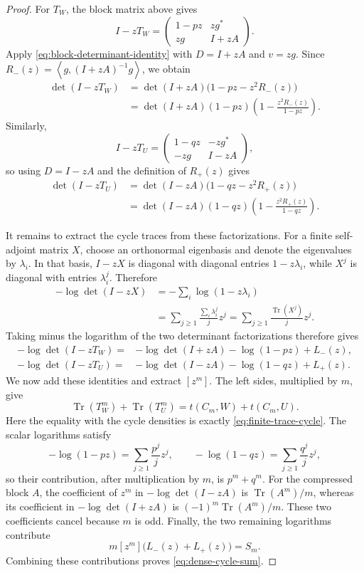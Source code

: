 \documentclass[11pt]{article}
\newcommand{\ip}[2]{\left\langle #1,#2\right\rangle}
\newcommand{\Tr}{\operatorname{Tr}}
\begin{document}
\begin{proof}
For \(T_W\), the block matrix above gives
\[
 I-zT_W=
 \begin{pmatrix}
  1-pz&zg^*\\
  zg&I+zA
 \end{pmatrix}.
\]
Apply \eqref{eq:block-determinant-identity} with
\(D=I+zA\) and \(v=zg\).  Since
\(R_-(z)=\ip g{(I+zA)^{-1}g}\), we obtain
\begin{align*}
 \det(I-zT_W)
 &=\det(I+zA)\bigl(1-pz-z^2R_-(z)\bigr)\\
 &=\det(I+zA)(1-pz)
   \left(1-\frac{z^2R_-(z)}{1-pz}\right).
\end{align*}
Similarly,
\[
 I-zT_U=
 \begin{pmatrix}
  1-qz&-zg^*\\
  -zg&I-zA
 \end{pmatrix},
\]
so using \(D=I-zA\) and the definition of \(R_+(z)\) gives
\begin{align*}
 \det(I-zT_U)
 &=\det(I-zA)\bigl(1-qz-z^2R_+(z)\bigr)\\
 &=\det(I-zA)(1-qz)
   \left(1-\frac{z^2R_+(z)}{1-qz}\right).
\end{align*}

It remains to extract the cycle traces from these factorizations.  For a
finite self-adjoint matrix \(X\), choose an orthonormal eigenbasis and denote
the eigenvalues by \(\lambda_i\).  In that basis, \(I-zX\) is diagonal with
diagonal entries \(1-z\lambda_i\), while \(X^j\) is diagonal with entries
\(\lambda_i^j\).  Therefore
\[
\begin{aligned}
 -\log\det(I-zX)
 &=-\sum_i\log(1-z\lambda_i)\\
 &=\sum_{j\ge1}\frac{\sum_i\lambda_i^j}{j}z^j
 =\sum_{j\ge1}\frac{\Tr(X^j)}{j}z^j.
\end{aligned}
\]
Taking minus the logarithm of the two determinant factorizations therefore
gives
\begin{align*}
 -\log\det(I-zT_W)
 ={}&-\log\det(I+zA)-\log(1-pz)+L_-(z),\\
 -\log\det(I-zT_U)
 ={}&-\log\det(I-zA)-\log(1-qz)+L_+(z).
\end{align*}
We now add these identities and extract \([z^m]\).  The left sides,
multiplied by \(m\), give
\[
       \Tr(T_W^m)+\Tr(T_U^m)
       =t(C_m,W)+t(C_m,U).
\]
Here the equality with the cycle densities is exactly
\eqref{eq:finite-trace-cycle}.
The scalar logarithms satisfy
\[
       -\log(1-pz)=\sum_{j\ge1}\frac{p^j}{j}z^j,
       \qquad
       -\log(1-qz)=\sum_{j\ge1}\frac{q^j}{j}z^j,
\]
so their contribution, after multiplication by \(m\), is \(p^m+q^m\).
For the compressed block \(A\), the coefficient of \(z^m\) in
\(-\log\det(I-zA)\) is \(\Tr(A^m)/m\), whereas its coefficient in
\(-\log\det(I+zA)\) is \((-1)^m\Tr(A^m)/m\).  These two coefficients cancel
because \(m\) is odd.  Finally, the two remaining logarithms contribute
\[
       m[z^m]\bigl(L_-(z)+L_+(z)\bigr)=S_m.
\]
Combining these contributions proves \eqref{eq:dense-cycle-sum}.


\end{proof}
\end{document}
